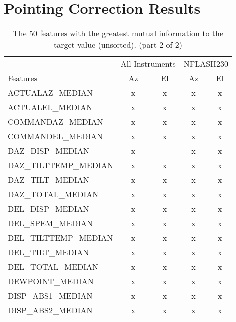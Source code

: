 \section{Pointing Correction Results}
\begin{table}[!htbp]
    \centering
    \caption{The $50$ features with the greatest mutual information to the target value (unsorted). (part 2 of 2)}
    \begin{tabular}{lcccc}
        \toprule
        & \multicolumn{2}{c}{All Instruments} & \multicolumn{2}{c}{NFLASH230}\\
        \cmidrule(lr){2-3} \cmidrule(lr){4-5}
        Features & Az & El & Az & El \\  \hline
        ACTUALAZ\_MEDIAN       &      x &      x &      x &      x   \\ \hline
        ACTUALEL\_MEDIAN       &      x &      x &      x &      x   \\ \hline
        COMMANDAZ\_MEDIAN       &      x &      x &      x &      x  \\ \hline
        COMMANDEL\_MEDIAN       &      x &      x &      x &      x  \\ \hline
        DAZ\_DISP\_MEDIAN       &      x &        &      x &      x  \\ \hline
        DAZ\_TILTTEMP\_MEDIAN &      x &      x &      x &      x   \\ \hline
        DAZ\_TILT\_MEDIAN      &      x &      x &      x &      x   \\ \hline
        DAZ\_TOTAL\_MEDIAN      &      x &      x &      x &      x  \\ \hline
        DEL\_DISP\_MEDIAN      &      x &      x &      x &      x   \\ \hline
        DEL\_SPEM\_MEDIAN     &      x &      x &      x &      x   \\ \hline
        DEL\_TILTTEMP\_MEDIAN &      x &      x &      x &      x   \\ \hline
        DEL\_TILT\_MEDIAN     &      x &      x &      x &      x   \\ \hline
        DEL\_TOTAL\_MEDIAN    &      x &      x &      x &      x   \\ \hline
        DEWPOINT\_MEDIAN       &      x &      x &      x &      x   \\ \hline
        DISP\_ABS1\_MEDIAN    &      x &      x &      x &      x  \\ \hline
        DISP\_ABS2\_MEDIAN    &      x &      x &      x &      x  \\ \hline

\end{tabular}
\end{table}
